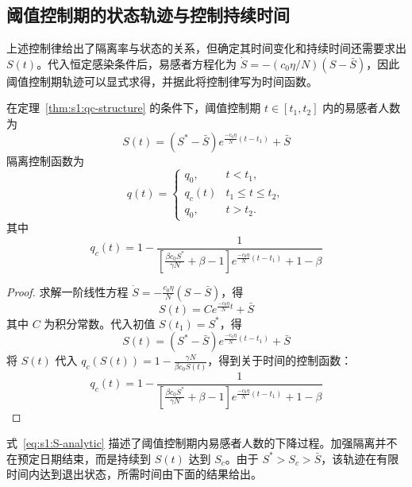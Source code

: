 \documentclass[lang=cn,a4paper,newtx]{elegantpaper}
\numberwithin{equation}{section}
\theoremstyle{plain}
\begin{document}
\subsection{阈值控制期的状态轨迹与控制持续时间}
上述控制律给出了隔离率与状态的关系，但确定其时间变化和持续时间还需要求出 $S(t)$。代入恒定感染条件后，易感者方程化为 $\dot S=-(c_0\eta/N)(S-\bar S)$，因此阈值控制期轨迹可以显式求得，并据此将控制律写为时间函数。
\begin{theorem}
    在定理~\ref{thm:s1:qc-structure} 的条件下，阈值控制期 $t\in[t_1,t_2]$ 内的易感者人数为
    \begin{equation}
        S(t) = \left( S^* - \bar S \right) e^{\frac{-c_0\eta}{N}(t - t_1 )} + \bar S
        \label{eq:s1:S-analytic}
    \end{equation}
    隔离控制函数为
    \begin{equation*}
    q(t) =
    \begin{cases}
    q_0, & t < t_1, \\
    q_c(t) & t_1 \le t \le t_2, \\
    q_0, & t > t_2.       
    \end{cases}
    \end{equation*}
    其中
    \begin{equation}
        q_c(t)= 1 - \frac{1}{\left[\frac{\beta c_0 S^* }{\gamma N} + \beta- 1 \right] e^{\frac{-c_0 \eta}{N} (t-t_1)} + 1-\beta} 
    \end{equation}
\end{theorem}
\begin{proof}
    求解一阶线性方程 $\dot{S}=-\frac{c_0\eta}{N}(S-\bar S)$，得
    \[
        S(t) = C e^{\frac{-c_0 \eta}{N} t} + \bar S
    \]
    其中 $C$ 为积分常数。代入初值 $S(t_1)=S^*$，得
    \[
    S(t) = \left( S^* - \bar S \right) e^{\frac{-c_0\eta}{N}(t - t_1 )} + \bar S
    \]
    将 $S(t)$ 代入 $q_c(S(t))=1-\frac{\gamma N}{\beta c_0 S(t)}$，得到关于时间的控制函数：
    \[
    q_c(t)= 1 - \frac{1}{\left[\frac{\beta c_0 S^* }{\gamma N} + \beta- 1 \right] e^{\frac{-c_0 \eta}{N} (t-t_1)} + 1-\beta}
    \]
\end{proof}
式~\eqref{eq:s1:S-analytic} 描述了阈值控制期内易感者人数的下降过程。加强隔离并不在预定日期结束，而是持续到 $S(t)$ 达到 $S_c$。由于 $S^*>S_c>\bar S$，该轨迹在有限时间内达到退出状态，所需时间由下面的结果给出。
\end{document}
